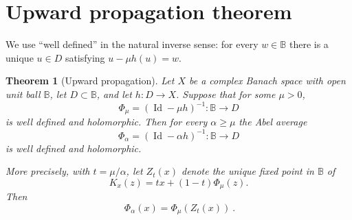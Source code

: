 \documentclass[11pt]{article}
\newtheorem{theorem}{Theorem}
\newcommand{\B}{\mathbb B}
\newcommand{\Id}{\operatorname{Id}}
\begin{document}
\section{Upward propagation theorem}

We use ``well defined'' in the natural inverse sense: for every $w\in\B$
there is a unique $u\in D$ satisfying $u-\mu h(u)=w$.

\begin{theorem}[Upward propagation]
Let $X$ be a complex Banach space with open unit ball $\B$, let
$D\subset\B$, and let $h:D\to X$.  Suppose that for some $\mu>0$,
\[
  \Phi_\mu=(\Id-\mu h)^{-1}:\B\longrightarrow D
\]
is well defined and holomorphic.  Then for every $\alpha\geq\mu$ the Abel
average
\[
  \Phi_\alpha=(\Id-\alpha h)^{-1}:\B\longrightarrow D
\]
is well defined and holomorphic.

More precisely, with $t=\mu/\alpha$, let $Z_t(x)$ denote the unique fixed
point in $\B$ of
\[
  K_x(z)=t x+(1-t)\Phi_\mu(z).
\]
Then
\[
  \boxed{\ \Phi_\alpha(x)=\Phi_\mu(Z_t(x))\ }.
\]
\end{theorem}
\end{document}

